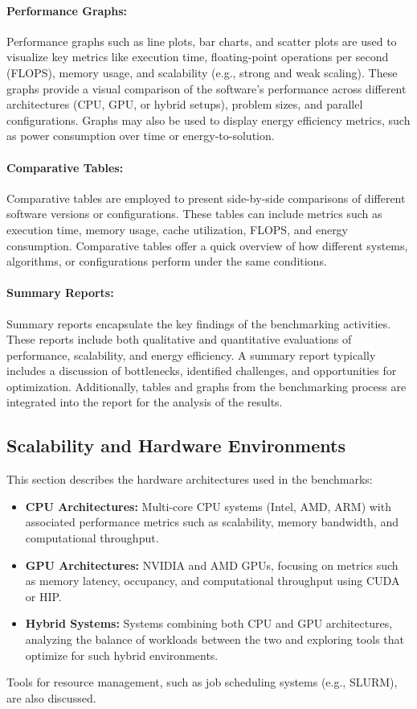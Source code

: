 \paragraph{Performance Graphs:} Performance graphs such as line plots, bar charts, and scatter plots are used to visualize key metrics like execution time, floating-point operations per second (FLOPS), memory usage, and scalability (e.g., strong and weak scaling). These graphs provide a visual comparison of the software's performance across different architectures (CPU, GPU, or hybrid setups), problem sizes, and parallel configurations. Graphs may also be used to display energy efficiency metrics, such as power consumption over time or energy-to-solution.

\paragraph{Comparative Tables:} Comparative tables are employed to present side-by-side comparisons of different software versions or configurations. These tables can include metrics such as execution time, memory usage, cache utilization, FLOPS, and energy consumption. Comparative tables offer a quick overview of how different systems, algorithms, or configurations perform under the same conditions.

\paragraph{Summary Reports:} Summary reports encapsulate the key findings of the benchmarking activities. These reports include both qualitative and quantitative evaluations of performance, scalability, and energy efficiency. A summary report typically includes a discussion of bottlenecks, identified challenges, and opportunities for optimization. Additionally, tables and graphs from the benchmarking process are integrated into the report for the analysis of the results.


\subsection{Scalability and Hardware Environments}
\label{sec:methodology-environments}

This section describes the hardware architectures used in the benchmarks:
\begin{itemize}
    \item \textbf{CPU Architectures:} Multi-core CPU systems (Intel, AMD, ARM) with associated performance metrics such as scalability, memory bandwidth, and computational throughput.
    \item \textbf{GPU Architectures:} NVIDIA and AMD GPUs, focusing on metrics such as memory latency, occupancy, and computational throughput using CUDA or HIP.
    \item \textbf{Hybrid Systems:} Systems combining both CPU and GPU architectures, analyzing the balance of workloads between the two and exploring tools that optimize for such hybrid environments.
\end{itemize}
Tools for resource management, such as job scheduling systems (e.g., SLURM), are also discussed.


